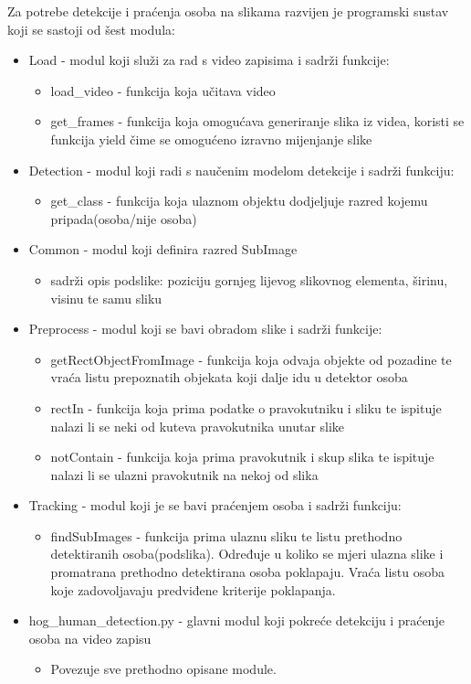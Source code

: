\documentclass[times, utf8, seminar, numeric]{fer}
\begin{document}
Za potrebe detekcije i praćenja osoba na slikama razvijen je programski sustav koji se sastoji od šest modula:
\begin{itemize}
	\item Load - modul koji služi za rad s video zapisima i sadrži funkcije:
	\begin{itemize}
		\item load\_video - funkcija koja učitava video 
		\item get\_frames - funkcija koja omogućava generiranje slika iz videa, koristi se funkcija yield čime se omogućeno izravno mijenjanje slike
	\end{itemize}
	
	\item Detection - modul koji radi s naučenim modelom detekcije i sadrži funkciju:
	\begin{itemize}
		\item get\_class - funkcija koja ulaznom objektu dodjeljuje razred kojemu pripada(osoba/nije osoba)
	\end{itemize}
	\item Common - modul koji definira razred SubImage 
	\begin{itemize}
	
	\item sadrži opis podslike: poziciju gornjeg lijevog slikovnog elementa, širinu, visinu te 
			 samu sliku
	\end{itemize}
	
	\item Preprocess - modul koji se bavi obradom slike i sadrži funkcije:
		\begin{itemize}
		\item getRectObjectFromImage - funkcija koja odvaja objekte od pozadine te vraća listu prepoznatih objekata koji dalje idu u detektor osoba
		\item rectIn - funkcija koja prima podatke o pravokutniku i sliku te ispituje nalazi li se neki od kuteva pravokutnika unutar slike 
		\item notContain - funkcija koja prima pravokutnik i skup slika te ispituje nalazi li se ulazni pravokutnik na nekoj od slika 
\end{itemize}

	\item Tracking - modul koji je se bavi praćenjem osoba i sadrži funkciju:
		\begin{itemize}
			\item findSubImages - funkcija prima ulaznu sliku te listu prethodno detektiranih osoba(podslika). 
		  Određuje u koliko se mjeri ulazna slike i promatrana prethodno detektirana osoba poklapaju.
		  Vraća listu osoba koje zadovoljavaju predviđene kriterije poklapanja. 
	\end{itemize}
	
	\item hog\_human\_detection.py - glavni modul koji pokreće detekciju i praćenje osoba na video zapisu
		\begin{itemize}
			\item Povezuje sve prethodno opisane module. 
		\end{itemize}
\end{itemize}
\end{document}
